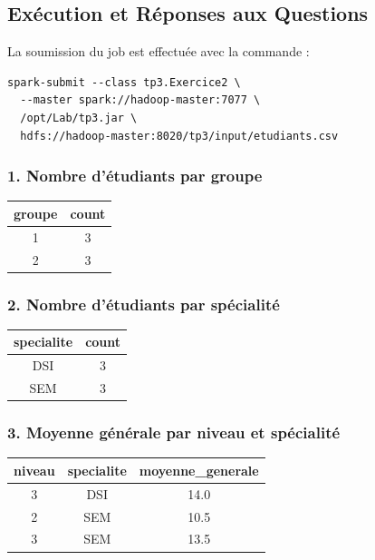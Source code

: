 \documentclass[11pt,a4paper]{article}
\begin{document}
\subsection{Exécution et Réponses aux Questions}
La soumission du job est effectuée avec la commande :
\begin{lstlisting}[style=custombash]
spark-submit --class tp3.Exercice2 \
  --master spark://hadoop-master:7077 \
  /opt/Lab/tp3.jar \
  hdfs://hadoop-master:8020/tp3/input/etudiants.csv
\end{lstlisting}

\subsubsection{1. Nombre d'étudiants par groupe}
\begin{center}
\begin{tabular}{|c|c|}
\hline
\textbf{groupe} & \textbf{count} \\
\hline
1 & 3 \\
2 & 3 \\
\hline
\end{tabular}
\end{center}

\subsubsection{2. Nombre d'étudiants par spécialité}
\begin{center}
\begin{tabular}{|c|c|}
\hline
\textbf{specialite} & \textbf{count} \\
\hline
DSI & 3 \\
SEM & 3 \\
\hline
\end{tabular}
\end{center}

\subsubsection{3. Moyenne générale par niveau et spécialité}
\begin{center}
\begin{tabular}{|c|c|c|}
\hline
\textbf{niveau} & \textbf{specialite} & \textbf{moyenne\_generale} \\
\hline
3 & DSI & 14.0 \\
2 & SEM & 10.5 \\
3 & SEM & 13.5 \\
\hline
\end{tabular}
\end{center}
\end{document}
